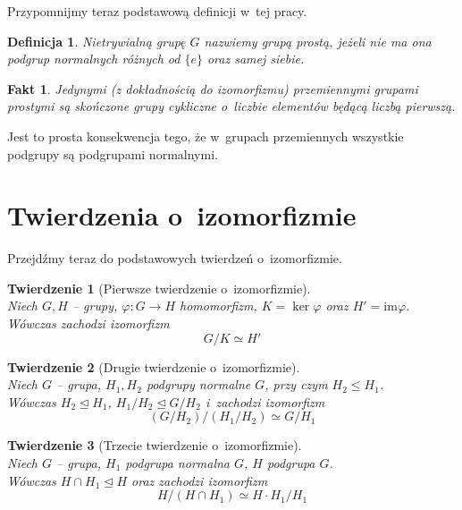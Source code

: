 \documentclass[licencjacka]{pracamgr}
\newtheorem{deff}{Definicja}[section]
\newtheorem{thh}{Twierdzenie}[section]
\newtheorem{fact}{Fakt}[section]
\begin{document}
Przypomnijmy teraz podstawową definicji w~tej pracy.
\begin{deff}
	Nietrywialną grupę $G$ nazwiemy \emph{grupą prostą}, jeżeli nie ma ona podgrup normalnych różnych od $\{e\}$ oraz samej siebie.
\end{deff}
\begin{fact}
	Jedynymi (z dokładnością do izomorfizmu) przemiennymi grupami prostymi są skończone grupy cykliczne o~liczbie elementów będącą liczbą pierwszą.
\end{fact}
Jest to prosta konsekwencja tego, że w~grupach przemiennych wszystkie podgrupy są podgrupami normalnymi.


\section{Twierdzenia o~izomorfizmie}
Przejdźmy teraz do podstawowych twierdzeń o~izomorfizmie.
\begin{thh}[Pierwsze twierdzenie o~izomorfizmie] $ $ \\
	Niech $G, H$ -- grupy, 	$ \varphi \colon G \to H$ homomorfizm, $K = \ker{\varphi}$ oraz $H' = \mathrm{im}\varphi $. \\
	Wówczas zachodzi izomorfizm $$G/K \simeq H'$$
\end{thh}
\begin{thh}[Drugie twierdzenie o~izomorfizmie]$ $\\
	Niech $G$ -- grupa, 	$H_1, H_2$ podgrupy normalne $G$, przy czym $H_2 \leq H_1$. \\
	Wówczas $H_2 \trianglelefteq H_1$, $H_1/H_2 \trianglelefteq G/H_2$ i~zachodzi izomorfizm
	$$ (G/H_2) / (H_1/H_2) \simeq G/H_1$$
\end{thh}
\begin{thh}[Trzecie twierdzenie o~izomorfizmie] $ $ \\
	Niech $G$ -- grupa, $H_1$ podgrupa normalna $G$, $H$ podgrupa $G$. \\
	Wówczas $H\cap H_1 \trianglelefteq H$ oraz zachodzi izomorfizm
	$$ H/(H\cap H_1) \simeq H \cdot H_1 / H_1 $$
\end{thh}
\end{document}
